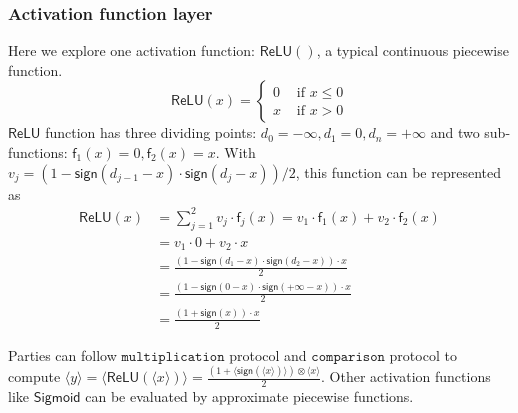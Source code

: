 \documentclass[letterpaper]{article} %
\begin{document}
    \subsubsection{Activation function layer}
    Here we explore one  activation function: $\mathsf{ReLU}()$, a typical continuous piecewise function.
    $$\mathsf{ReLU}(x)=\begin{cases}
        0 & \text{ if } x \leqslant 0  \\
        x & \text{ if } x > 0
        \end{cases}$$
    $\mathsf{ReLU}$ function has three dividing points: $d_{0}= -\infty ,d_{1}= 0, d_{n}=+\infty$ and two sub-functions:
    $\mathsf{f}_{1}(x)= 0 ,\mathsf{f}_{2}(x)= x$.
    With $v_{j} = (1-\mathsf{sign}(d_{j-1}-x)\cdot \mathsf{sign}(d_{j}-x))/2$, this function can be represented as
    \begin{align*}
        \mathsf{ReLU}(x)&=\sum_{j=1}^{2}v_{j}\cdot \mathsf{f}_{j}(x)=v_{1}\cdot \mathsf{f}_{1}(x)+v_{2}\cdot \mathsf{f}_{2}(x)\\
        &=v_{1}\cdot 0 +v_{2}\cdot x\\
        &=\frac{(1-\mathsf{sign}(d_{1}-x)\cdot \mathsf{sign}(d_{2}-x))\cdot x}{2} \\
        &=\frac{(1-\mathsf{sign}(0-x)\cdot \mathsf{sign}(+\infty -x))\cdot x}{2} \\
        &=\frac{(1+\mathsf{sign}(x))\cdot x}{2}
    \end{align*}

    Parties can follow $\mathtt{multiplication}$ protocol and $\mathtt{comparison}$ protocol to compute
    $\langle y\rangle=\langle \mathsf{ReLU}(\langle x\rangle)\rangle=\frac{(1+\langle \mathsf{sign}(\langle x\rangle)\rangle)\otimes \langle x\rangle}{2}$.
    Other activation functions like $\mathsf{Sigmoid}$ can be evaluated by
    approximate piecewise functions.
\end{document}
